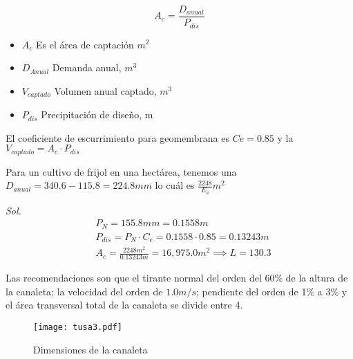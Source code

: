 \begin{equation}
    A_c =\frac{D_{anual}}{P_{dis}}
\end{equation}
\begin{notation}
\begin{itemize}
    \item $A_c$ Es el área de captación $m^2$
    \item $D_{Anual}$ Demanda anual, $m^3$
    \item $V_{captado}$ Volumen anual captado, $m^3$
    \item $P_{dis}$ Precipitación de diseño, m
\end{itemize}
El coeficiente de escurrimiento para geomembrana es $Ce=0.85$ y la $V_{captado}=A_c\cdot P_{dis}$
\end{notation}
\begin{example}
    Para un cultivo de frijol en una hectárea, tenemos una $D_{anual}= 340.6-115.8=224.8mm$ 
    lo cuál es $\frac{2248}{E_a} m^2$

    \textit{ Sol. }
    \begin{align*}
        &P_N = 155.8mm = 0.1558m\\
        &P_{dis} = P_N \cdot C_e = 0.1558 \cdot 0.85 = 0.13243m\\
        &A_c =\frac{2248m^2}{0.13243m} = 16,975.0m^2\implies L = 130.3
    \end{align*}
\end{example}
Las recomendaciones son que el tirante normal del orden del 60\% de la altura de la canaleta; la velocidad del orden de $1.0m/s$; pendiente del orden de 1\% a 3\% y el área transversal total de la canaleta se divide entre 4.
\begin{figure}[h!]
\centering
  \texttt{[image: tusa3.pdf]}
  \caption{Dimensiones de la canaleta}
  \label{tusa3}
\end{figure}
